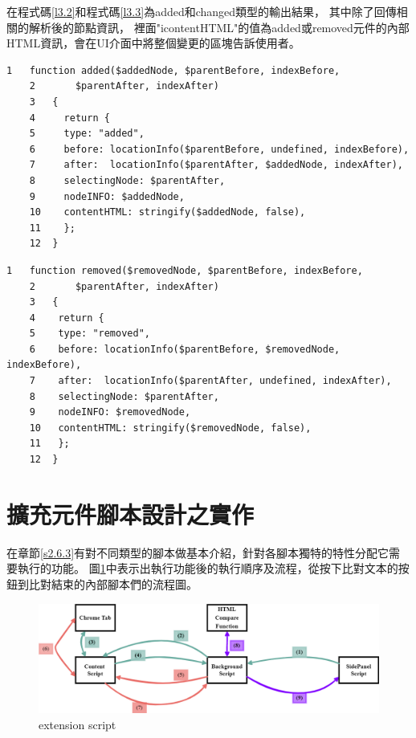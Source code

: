 在程式碼\ref{l3.2}和程式碼\ref{l3.3}為added和changed類型的輸出結果，
其中除了回傳相關的解析後的節點資訊，
裡面"icontentHTML"的值為added或removed元件的內部HTML資訊，會在UI介面中將整個變更的區塊告訴使用者。

\begin{lstlisting}[caption=比對輸出結果(added類型), label={l3.2}]
    1   function added($addedNode, $parentBefore, indexBefore, 
    2       $parentAfter, indexAfter) 
    3   {
    4     return {
    5     type: "added",
    6     before: locationInfo($parentBefore, undefined, indexBefore),
    7     after:  locationInfo($parentAfter, $addedNode, indexAfter),
    8     selectingNode: $parentAfter,
    9     nodeINFO: $addedNode,
    10    contentHTML: stringify($addedNode, false),
    11    };
    12  }
\end{lstlisting}

\begin{lstlisting}[caption=比對輸出結果(removed類型), label={l3.3}]
    1   function removed($removedNode, $parentBefore, indexBefore, 
    2       $parentAfter, indexAfter) 
    3   {
    4    return {
    5    type: "removed",
    6    before: locationInfo($parentBefore, $removedNode, indexBefore),
    7    after:  locationInfo($parentAfter, undefined, indexAfter),
    8    selectingNode: $parentAfter,
    9    nodeINFO: $removedNode,
    10   contentHTML: stringify($removedNode, false),
    11   };
    12  }
\end{lstlisting}


\section{擴充元件腳本設計之實作}\label{s3.3}
\indent
在章節\ref{s2.6.3}有對不同類型的腳本做基本介紹，針對各腳本獨特的特性分配它需要執行的功能。
圖\ref{f3.4}中表示出執行功能後的執行順序及流程，從按下比對文本的按鈕到比對結束的內部腳本們的流程圖。

\indent

\begin{figure}[H]
    \centering
    \includegraphics[width=1\textwidth]{picture/ch3-script-structure.png}
    \caption{extension script}
    \label{f3.4}
\end{figure}

